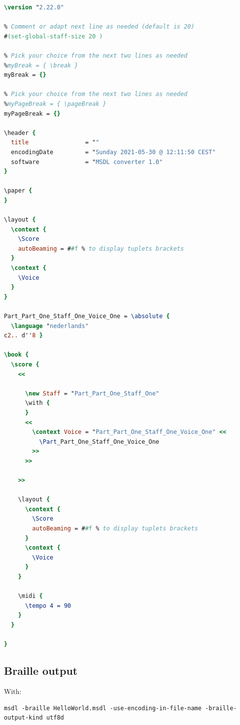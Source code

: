 \begin{lstlisting}[language=Lilypond]
\version "2.22.0"

% Comment or adapt next line as needed (default is 20)
#(set-global-staff-size 20 )

% Pick your choice from the next two lines as needed
%myBreak = { \break }
myBreak = {}

% Pick your choice from the next two lines as needed
%myPageBreak = { \pageBreak }
myPageBreak = {}

\header {
  title                = ""
  encodingDate         = "Sunday 2021-05-30 @ 12:11:50 CEST"
  software             = "MSDL converter 1.0"
}

\paper {
}

\layout {
  \context {
    \Score
    autoBeaming = ##f % to display tuplets brackets
  }
  \context {
    \Voice
  }
}

Part_Part_One_Staff_One_Voice_One = \absolute {
  \language "nederlands"
c2.. d''8 }

\book {
  \score {
    <<

      \new Staff = "Part_Part_One_Staff_One"
      \with {
      }
      <<
        \context Voice = "Part_Part_One_Staff_One_Voice_One" <<
          \Part_Part_One_Staff_One_Voice_One
        >>
      >>

    >>

    \layout {
      \context {
        \Score
        autoBeaming = ##f % to display tuplets brackets
      }
      \context {
        \Voice
      }
    }

    \midi {
      \tempo 4 = 90
    }
  }

}
\end{lstlisting}

\subsection{Braille output}

With:
\begin{lstlisting}[language=Terminal]
msdl -braille HelloWorld.msdl -use-encoding-in-file-name -braille-output-kind utf8d
\end{lstlisting}


